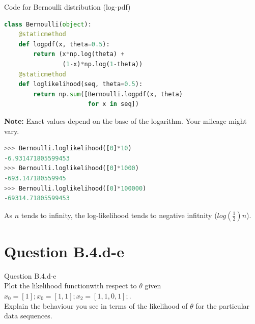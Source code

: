 \documentclass[usenames,dvipsnames,table]{beamer}
\begin{document}
\begin{frame}[fragile]
Code for Bernoulli distribution (log-pdf)
\begin{lstlisting}[language=Python]
class Bernoulli(object):
    @staticmethod
    def logpdf(x, theta=0.5):
        return (x*np.log(theta) +
                (1-x)*np.log(1-theta))
    @staticmethod
    def loglikelihood(seq, theta=0.5):
        return np.sum([Bernoulli.logpdf(x, theta)
                       for x in seq])
\end{lstlisting}
\end{frame}

\begin{frame}[fragile]
\textbf{Note:} Exact values depend on the base of the logarithm. Your mileage might vary.
\begin{lstlisting}[language=Python]
>>> Bernoulli.loglikelihood([0]*10)
-6.931471805599453
>>> Bernoulli.loglikelihood([0]*1000)
-693.147180559945
>>> Bernoulli.loglikelihood([0]*100000)
-69314.71805599453
\end{lstlisting}

As $n$ tends to infinity, the log-likelihood tends to negative infitnity ($log(\frac{1}{2})n$).
\end{frame}










\section{Question B.4.d-e}
\begin{frame}
\begin{center}
{\huge{Question B.4.d-e}}
\\\vspace{2em}
Plot the likelihood functionwith respect to $\theta$ given $x_0 = [1]; x_0 = [1, 1]; x_2 = [1, 1, 0, 1];$.
\\\vspace{1em}
Explain the behaviour you see in terms of the likelihood of $\theta$ for the particular data sequences.
\end{center}
\end{frame}
\end{document}
